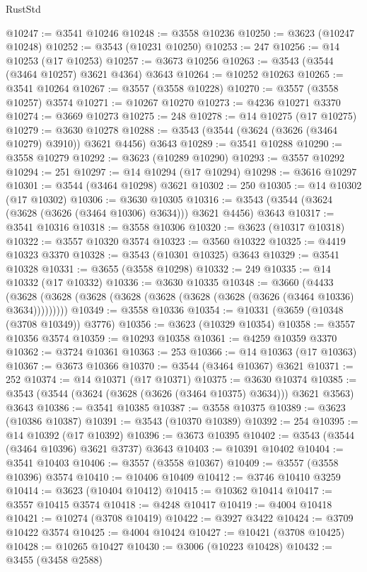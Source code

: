 \begin{lexlean}{RustStd}
\begin{coremodule}
@10247 := @3541 @10246
@10248 := @3558 @10236
@10250 := @3623 (@10247 @10248)
@10252 := @3543 (@10231 @10250)
@10253 := 247
@10256 := @14 @10253 (@17 @10253)
@10257 := @3673 @10256
@10263 := @3543 (@3544 (@3464 @10257) @3621 @4364) @3643
@10264 := @10252 @10263
@10265 := @3541 @10264
@10267 := @3557 (@3558 @10228)
@10270 := @3557 (@3558 @10257) @3574
@10271 := @10267 @10270
@10273 := @4236 @10271 @3370
@10274 := @3669 @10273
@10275 := 248
@10278 := @14 @10275 (@17 @10275)
@10279 := @3630 @10278
@10288 := @3543 (@3544 (@3624 (@3626 (@3464 @10279) @3910)) @3621 @4456) @3643
@10289 := @3541 @10288
@10290 := @3558 @10279
@10292 := @3623 (@10289 @10290)
@10293 := @3557 @10292
@10294 := 251
@10297 := @14 @10294 (@17 @10294)
@10298 := @3616 @10297
@10301 := @3544 (@3464 @10298) @3621
@10302 := 250
@10305 := @14 @10302 (@17 @10302)
@10306 := @3630 @10305
@10316 := @3543 (@3544 (@3624 (@3628 (@3626 (@3464 @10306) @3634))) @3621 @4456) @3643
@10317 := @3541 @10316
@10318 := @3558 @10306
@10320 := @3623 (@10317 @10318)
@10322 := @3557 @10320 @3574
@10323 := @3560 @10322
@10325 := @4419 @10323 @3370
@10328 := @3543 (@10301 @10325) @3643
@10329 := @3541 @10328
@10331 := @3655 (@3558 @10298)
@10332 := 249
@10335 := @14 @10332 (@17 @10332)
@10336 := @3630 @10335
@10348 := @3660
    (@4433 (@3628 (@3628 (@3628 (@3628 (@3628 (@3628 (@3628 (@3626 (@3464 @10336) @3634)))))))))
@10349 := @3558 @10336
@10354 := @10331 (@3659 (@10348 (@3708 @10349)) @3776)
@10356 := @3623 (@10329 @10354)
@10358 := @3557 @10356 @3574
@10359 := @10293 @10358
@10361 := @4259 @10359 @3370
@10362 := @3724 @10361
@10363 := 253
@10366 := @14 @10363 (@17 @10363)
@10367 := @3673 @10366
@10370 := @3544 (@3464 @10367) @3621
@10371 := 252
@10374 := @14 @10371 (@17 @10371)
@10375 := @3630 @10374
@10385 := @3543 (@3544 (@3624 (@3628 (@3626 (@3464 @10375) @3634))) @3621 @3563) @3643
@10386 := @3541 @10385
@10387 := @3558 @10375
@10389 := @3623 (@10386 @10387)
@10391 := @3543 (@10370 @10389)
@10392 := 254
@10395 := @14 @10392 (@17 @10392)
@10396 := @3673 @10395
@10402 := @3543 (@3544 (@3464 @10396) @3621 @3737) @3643
@10403 := @10391 @10402
@10404 := @3541 @10403
@10406 := @3557 (@3558 @10367)
@10409 := @3557 (@3558 @10396) @3574
@10410 := @10406 @10409
@10412 := @3746 @10410 @3259
@10414 := @3623 (@10404 @10412)
@10415 := @10362 @10414
@10417 := @3557 @10415 @3574
@10418 := @4248 @10417
@10419 := @4004 @10418
@10421 := @10274 (@3708 @10419)
@10422 := @3927 @3422
@10424 := @3709 @10422 @3574
@10425 := @4004 @10424
@10427 := @10421 (@3708 @10425)
@10428 := @10265 @10427
@10430 := @3006 (@10223 @10428)
@10432 := @3455 (@3458 @2588)

\end{coremodule}
\end{lexlean}
